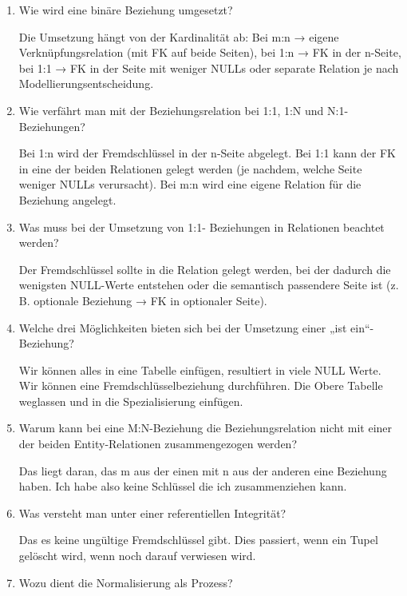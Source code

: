 \documentclass[a4paper]{article}
\begin{document}
\begin{enumerate}
    Ein schwacher Entitätstyp wird im relationalen Modell durch eine Relation umgesetzt, deren Primärschlüssel aus dem Fremdschlüssel auf die Besitzer-Relation plus dem teilweisen Schlüssel des schwachen Typs besteht (komposites PK).
    \item Wie wird eine binäre Beziehung umgesetzt?

    Die Umsetzung hängt von der Kardinalität ab: Bei m:n → eigene Verknüpfungsrelation (mit FK auf beide Seiten), bei 1:n → FK in der n-Seite, bei 1:1 → FK in der Seite mit weniger NULLs oder separate Relation je nach Modellierungsentscheidung.

    \newpage
    \item Wie verfährt man mit der Beziehungsrelation bei 1:1, 1:N und N:1-Beziehungen?

    Bei 1:n wird der Fremdschlüssel in der n-Seite abgelegt. Bei 1:1 kann der FK in eine der beiden Relationen gelegt werden (je nachdem, welche Seite weniger NULLs verursacht). Bei m:n wird eine eigene Relation für die Beziehung angelegt.
    \item Was muss bei der Umsetzung von 1:1- Beziehungen in Relationen beachtet werden?

    Der Fremdschlüssel sollte in die Relation gelegt werden, bei der dadurch die wenigsten NULL-Werte entstehen oder die semantisch passendere Seite ist (z. B. optionale Beziehung → FK in optionaler Seite).
    \item Welche drei Möglichkeiten bieten sich bei der Umsetzung einer „ist ein“-Beziehung?
    
    Wir können alles in eine Tabelle einfügen, resultiert in viele NULL Werte. Wir können eine Fremdschlüsselbeziehung durchführen. Die Obere Tabelle weglassen und in die Spezialisierung einfügen.
    \item Warum kann bei eine M:N-Beziehung die Beziehungsrelation nicht mit einer der beiden Entity-Relationen zusammengezogen werden?
    
    Das liegt daran, das m aus der einen mit n aus der anderen eine Beziehung haben. Ich habe also keine Schlüssel die ich zusammenziehen kann.
    \item Was versteht man unter einer referentiellen Integrität?
    
    Das es keine ungültige Fremdschlüssel gibt. Dies passiert, wenn ein Tupel gelöscht wird, wenn noch darauf verwiesen wird.
    \item Wozu dient die Normalisierung als Prozess?
    

\end{enumerate}
\end{document}
